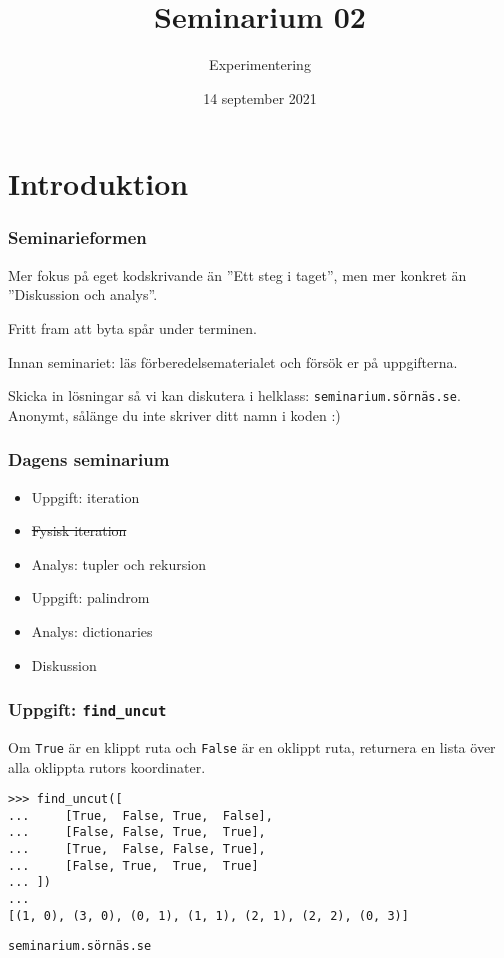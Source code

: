 \documentclass{beamer}
\title{Seminarium 02}
\subtitle{Experimentering}
\date{14 september 2021}
\begin{document}
  \frame{\titlepage}

  \section*{Introduktion}

  \begin{frame}
    \frametitle{Seminarieformen}

    Mer fokus på eget kodskrivande än ''Ett steg i taget'', men mer konkret än
    ''Diskussion och analys''.

    Fritt fram att byta spår under terminen.

    Innan seminariet: läs förberedelsematerialet och försök er på uppgifterna.

    Skicka in lösningar så vi kan diskutera i helklass:
    \texttt{seminarium.sörnäs.se}. Anonymt, sålänge du inte skriver ditt namn i
    koden :)

  \end{frame}

  \begin{frame}
    \frametitle{Dagens seminarium}

    \begin{itemize}
      \item Uppgift: iteration
      \item \sout{Fysisk iteration}
      \item Analys: tupler och rekursion
      \item Uppgift: palindrom
      \item Analys: dictionaries
      \item Diskussion
    \end{itemize}

  \end{frame}

  \begin{frame}[fragile]
    \frametitle{Uppgift: \texttt{find\_uncut}}

    Om \texttt{True} är en klippt ruta och \texttt{False} är en oklippt ruta,
    returnera en lista över alla oklippta rutors koordinater.

    \begin{verbatim}
>>> find_uncut([
...     [True,  False, True,  False],
...     [False, False, True,  True],
...     [True,  False, False, True],
...     [False, True,  True,  True]
... ])
...
[(1, 0), (3, 0), (0, 1), (1, 1), (2, 1), (2, 2), (0, 3)]
    \end{verbatim}

    \texttt{seminarium.sörnäs.se}

  \end{frame}
\end{document}
